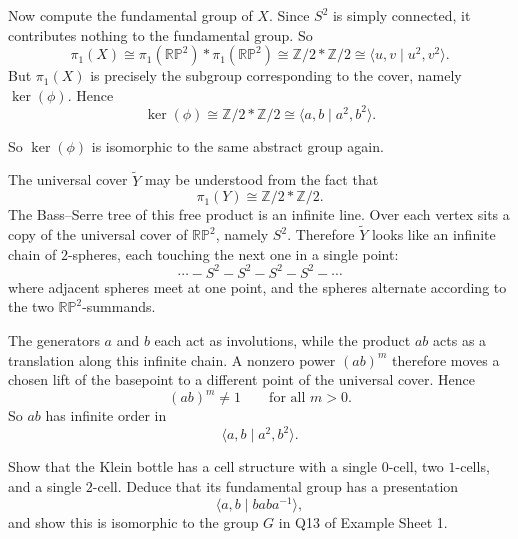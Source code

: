 \begin{solution}
Now compute the fundamental group of \(X\). Since \(S^2\) is simply connected, it contributes nothing to the fundamental group. So
\[
\pi_1(X)\cong \pi_1(\mathbb{RP}^2)*\pi_1(\mathbb{RP}^2)
\cong \mathbb Z/2 * \mathbb Z/2
\cong \langle u,v \mid u^2,v^2\rangle.
\]
But \(\pi_1(X)\) is precisely the subgroup corresponding to the cover, namely \(\ker(\phi)\). Hence
\[
\ker(\phi)\cong \mathbb Z/2 * \mathbb Z/2
\cong \langle a,b \mid a^2,b^2\rangle.
\]

So \(\ker(\phi)\) is isomorphic to the same abstract group again.

\par


The universal cover \(\widetilde{Y}\) may be understood from the fact that
\[
\pi_1(Y)\cong \mathbb Z/2 * \mathbb Z/2.
\]
The Bass--Serre tree of this free product is an infinite line. Over each vertex sits a copy of the universal cover of \(\mathbb{RP}^2\), namely \(S^2\). Therefore \(\widetilde{Y}\) looks like an infinite chain of \(2\)-spheres, each touching the next one in a single point:
\[
\cdots - S^2 - S^2 - S^2 - S^2 - \cdots
\]
where adjacent spheres meet at one point, and the spheres alternate according to the two \(\mathbb{RP}^2\)-summands.

The generators \(a\) and \(b\) each act as involutions, while the product \(ab\) acts as a translation along this infinite chain. A nonzero power \((ab)^m\) therefore moves a chosen lift of the basepoint to a different point of the universal cover. Hence
\[
(ab)^m\neq 1 \qquad \text{for all } m>0.
\]
So \(ab\) has infinite order in
\[
\langle a,b \mid a^2,b^2\rangle.
\]

\par
\end{solution}

\begin{problem}
Show that the Klein bottle has a cell structure with a single \(0\)-cell, two \(1\)-cells, and a single \(2\)-cell. Deduce that its fundamental group has a presentation
\[
\langle a,b \mid baba^{-1}\rangle,
\]
and show this is isomorphic to the group \(G\) in Q13 of Example Sheet 1.

\par
\end{problem}

